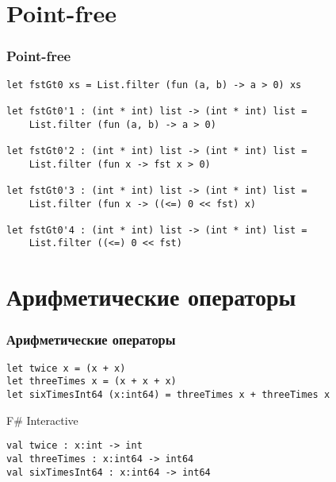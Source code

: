 \documentclass[xetex,mathserif,serif]{beamer}
\begin{document}
	\section{Point-free}
	
	\begin{frame}[fragile]
		\frametitle{Point-free}
		\begin{verbatim}
let fstGt0 xs = List.filter (fun (a, b) -> a > 0) xs

let fstGt0'1 : (int * int) list -> (int * int) list = 
    List.filter (fun (a, b) -> a > 0)

let fstGt0'2 : (int * int) list -> (int * int) list = 
    List.filter (fun x -> fst x > 0)

let fstGt0'3 : (int * int) list -> (int * int) list = 
    List.filter (fun x -> ((<=) 0 << fst) x)

let fstGt0'4 : (int * int) list -> (int * int) list = 
    List.filter ((<=) 0 << fst)
		\end{verbatim}
	\end{frame}

	\section{Арифметические операторы}

	\begin{frame}[fragile]
		\frametitle{Арифметические операторы}
		\begin{verbatim}
let twice x = (x + x)
let threeTimes x = (x + x + x)
let sixTimesInt64 (x:int64) = threeTimes x + threeTimes x
		\end{verbatim}

		\begin{alertblock}{F\# Interactive}
			\begin{verbatim}
val twice : x:int -> int
val threeTimes : x:int64 -> int64
val sixTimesInt64 : x:int64 -> int64
			\end{verbatim}
		\end{alertblock}
	\end{frame}
\end{document}

